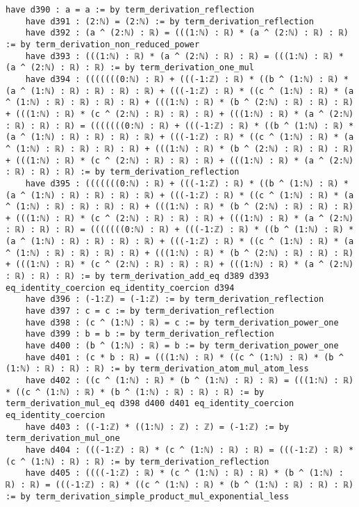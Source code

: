 \documentclass{article}
\begin{document}
\begin{tcolorbox}[colback=white!10, width=\linewidth]
\begin{lstlisting}[language=Lean4]
    have d390 : a = a := by term_derivation_reflection
    have d391 : (2:ℕ) = (2:ℕ) := by term_derivation_reflection
    have d392 : (a ^ (2:ℕ) : ℝ) = (((1:ℕ) : ℝ) * (a ^ (2:ℕ) : ℝ) : ℝ) := by term_derivation_non_reduced_power
    have d393 : (((1:ℕ) : ℝ) * (a ^ (2:ℕ) : ℝ) : ℝ) = (((1:ℕ) : ℝ) * (a ^ (2:ℕ) : ℝ) : ℝ) := by term_derivation_one_mul
    have d394 : (((((((0:ℕ) : ℝ) + (((-1:ℤ) : ℝ) * ((b ^ (1:ℕ) : ℝ) * (a ^ (1:ℕ) : ℝ) : ℝ) : ℝ) : ℝ) + (((-1:ℤ) : ℝ) * ((c ^ (1:ℕ) : ℝ) * (a ^ (1:ℕ) : ℝ) : ℝ) : ℝ) : ℝ) + (((1:ℕ) : ℝ) * (b ^ (2:ℕ) : ℝ) : ℝ) : ℝ) + (((1:ℕ) : ℝ) * (c ^ (2:ℕ) : ℝ) : ℝ) : ℝ) + (((1:ℕ) : ℝ) * (a ^ (2:ℕ) : ℝ) : ℝ) : ℝ) = (((((((0:ℕ) : ℝ) + (((-1:ℤ) : ℝ) * ((b ^ (1:ℕ) : ℝ) * (a ^ (1:ℕ) : ℝ) : ℝ) : ℝ) : ℝ) + (((-1:ℤ) : ℝ) * ((c ^ (1:ℕ) : ℝ) * (a ^ (1:ℕ) : ℝ) : ℝ) : ℝ) : ℝ) + (((1:ℕ) : ℝ) * (b ^ (2:ℕ) : ℝ) : ℝ) : ℝ) + (((1:ℕ) : ℝ) * (c ^ (2:ℕ) : ℝ) : ℝ) : ℝ) + (((1:ℕ) : ℝ) * (a ^ (2:ℕ) : ℝ) : ℝ) : ℝ) := by term_derivation_reflection
    have d395 : (((((((0:ℕ) : ℝ) + (((-1:ℤ) : ℝ) * ((b ^ (1:ℕ) : ℝ) * (a ^ (1:ℕ) : ℝ) : ℝ) : ℝ) : ℝ) + (((-1:ℤ) : ℝ) * ((c ^ (1:ℕ) : ℝ) * (a ^ (1:ℕ) : ℝ) : ℝ) : ℝ) : ℝ) + (((1:ℕ) : ℝ) * (b ^ (2:ℕ) : ℝ) : ℝ) : ℝ) + (((1:ℕ) : ℝ) * (c ^ (2:ℕ) : ℝ) : ℝ) : ℝ) + (((1:ℕ) : ℝ) * (a ^ (2:ℕ) : ℝ) : ℝ) : ℝ) = (((((((0:ℕ) : ℝ) + (((-1:ℤ) : ℝ) * ((b ^ (1:ℕ) : ℝ) * (a ^ (1:ℕ) : ℝ) : ℝ) : ℝ) : ℝ) + (((-1:ℤ) : ℝ) * ((c ^ (1:ℕ) : ℝ) * (a ^ (1:ℕ) : ℝ) : ℝ) : ℝ) : ℝ) + (((1:ℕ) : ℝ) * (b ^ (2:ℕ) : ℝ) : ℝ) : ℝ) + (((1:ℕ) : ℝ) * (c ^ (2:ℕ) : ℝ) : ℝ) : ℝ) + (((1:ℕ) : ℝ) * (a ^ (2:ℕ) : ℝ) : ℝ) : ℝ) := by term_derivation_add_eq d389 d393 eq_identity_coercion eq_identity_coercion d394
    have d396 : (-1:ℤ) = (-1:ℤ) := by term_derivation_reflection
    have d397 : c = c := by term_derivation_reflection
    have d398 : (c ^ (1:ℕ) : ℝ) = c := by term_derivation_power_one
    have d399 : b = b := by term_derivation_reflection
    have d400 : (b ^ (1:ℕ) : ℝ) = b := by term_derivation_power_one
    have d401 : (c * b : ℝ) = (((1:ℕ) : ℝ) * ((c ^ (1:ℕ) : ℝ) * (b ^ (1:ℕ) : ℝ) : ℝ) : ℝ) := by term_derivation_atom_mul_atom_less
    have d402 : ((c ^ (1:ℕ) : ℝ) * (b ^ (1:ℕ) : ℝ) : ℝ) = (((1:ℕ) : ℝ) * ((c ^ (1:ℕ) : ℝ) * (b ^ (1:ℕ) : ℝ) : ℝ) : ℝ) := by term_derivation_mul_eq d398 d400 d401 eq_identity_coercion eq_identity_coercion
    have d403 : ((-1:ℤ) * ((1:ℕ) : ℤ) : ℤ) = (-1:ℤ) := by term_derivation_mul_one
    have d404 : (((-1:ℤ) : ℝ) * (c ^ (1:ℕ) : ℝ) : ℝ) = (((-1:ℤ) : ℝ) * (c ^ (1:ℕ) : ℝ) : ℝ) := by term_derivation_reflection
    have d405 : ((((-1:ℤ) : ℝ) * (c ^ (1:ℕ) : ℝ) : ℝ) * (b ^ (1:ℕ) : ℝ) : ℝ) = (((-1:ℤ) : ℝ) * ((c ^ (1:ℕ) : ℝ) * (b ^ (1:ℕ) : ℝ) : ℝ) : ℝ) := by term_derivation_simple_product_mul_exponential_less

\end{lstlisting}
\end{tcolorbox}
\end{document}
